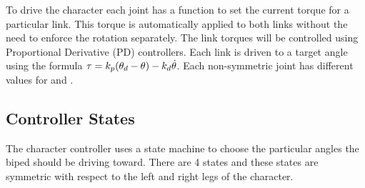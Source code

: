 To drive the character each joint has a function to set the current torque for a particular link. 
This torque is automatically applied to both links without the need to enforce the rotation separately.
The link torques will be controlled using Proportional Derivative (PD) controllers.
Each link is driven to a target angle using the formula $\tau = k_{p}(\theta_{d}- \theta) - k_{d}\dot{\theta} $.
Each non-symmetric joint has different values for \Kp and \Kd.

\subsection{Controller States}

The character controller uses a state machine to choose the particular angles the biped should be driving toward. 
There are 4 states and these states are symmetric with respect to the left and right legs of the character.

